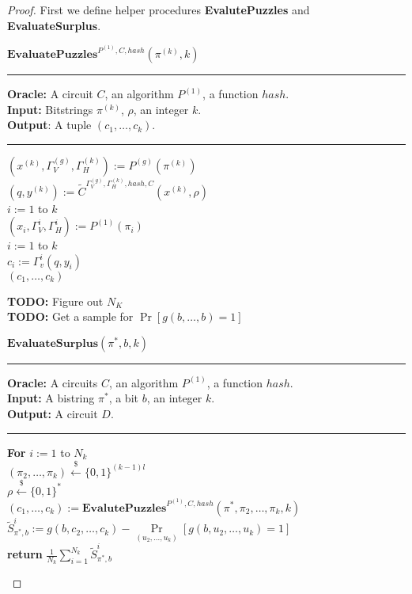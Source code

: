 \begin{proof}
First we define helper procedures \textbf{EvalutePuzzles} and \textbf{EvaluateSurplus}.
%
\begin{codeblock}
  $\textbf{EvaluatePuzzles}^{P^{(1)}, C, hash}(\pi^{(k)}, k)$
  \medskip \hrule \medskip
  \textbf{Oracle:}  A circuit $C$, an algorithm $P^{(1)}$, a function $hash$.\\
  \textbf{Input:} Bitstrings $\pi^{(k)}$, $\rho$, an integer $k$.\\
  \textbf{Output}: A tuple $(c_1, \dots, c_k)$.
  \medskip\hrule\medskip
  $(x^{(k)}, \Gamma_V^{(g)}, \Gamma_H^{(k)}) := P^{(g)}(\pi^{(k)})$ \\
  $(q,y^{(k)}) := \widetilde{C}^{\Gamma_V^{(g)}, \Gamma_H^{(k)}, hash, C}(x^{(k)}, \rho)$\\
  \For $i:=1$ to $k$ \Do \\
  \IndI $(x_i, \Gamma_V^{i}, \Gamma_H^{i}) := P^{(1)}(\pi_i)$\\
  \For $i:=1$ to $k$ \Do \\
  \IndI $c_i := \Gamma_v^{i}(q, y_i)$\\
  \return $(c_1, \dots, c_k)$\\
\end{codeblock}
%
\begin{todo}
  \textbf{TODO:} Figure out $N_K$\\
  \textbf{TODO:} Get a sample for $\Pr[g(b,\dots,b) = 1]$
\end{todo}
%
\begin{codeblock}
  $\textbf{EvaluateSurplus}(\pi^*, b, k)$
  \medskip
  \hrule
  \medskip
  \textbf{Oracle:} A circuits $C$, an algorithm $P^{(1)}$, a function $hash$.\\
  \textbf{Input:} A bistring $\pi^*$, a bit $b$, an integer $k$.\\
  \textbf{Output:} A circuit $D$.
  \medskip\hrule\medskip
  \textbf{For} $i:=1$ to $N_k$ \\
  \IndI $(\pi_2, \dots, \pi_k) \xleftarrow{\$} \{0,1\}^{(k-1)l}$\\
  \IndI $\rho \xleftarrow{\$} \{0,1\}^{*}$\\
  \IndI $(c_1, \dots, c_k) := \textbf{EvalutePuzzles}^{P^{(1)}, C, hash}(\pi^*, \pi_2, \dots, \pi_k, k)$\\
  \IndI $\widetilde{S}_{\pi^*,b}^i := g(b, c_2, \dots, c_k) - \underset{(u_2, \dots, u_k)}{\Pr}[g(b, u_2, \dots, u_k) = 1] $\\
  \textbf{return} $\frac{1}{N_k} \sum_{i=1}^{N_k} \widetilde{S}_{\pi^*,b}^i$\\

\end{codeblock}
\end{proof}
